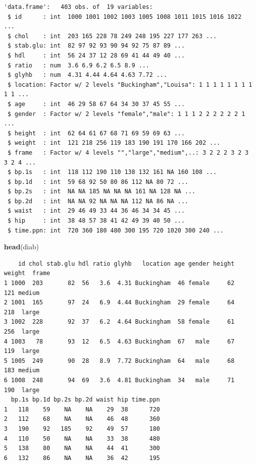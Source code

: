 \documentclass[
  11pt,
]{krantz}
\newenvironment{Shaded}{\begin{snugshade}}{\end{snugshade}}
\newcommand{\KeywordTok}[1]{\textcolor[rgb]{0.27,0.27,0.27}{\textbf{#1}}}
\newcommand{\NormalTok}[1]{#1}
\begin{document}
\begin{verbatim}
'data.frame':   403 obs. of  19 variables:
 $ id      : int  1000 1001 1002 1003 1005 1008 1011 1015 1016 1022 ...
 $ chol    : int  203 165 228 78 249 248 195 227 177 263 ...
 $ stab.glu: int  82 97 92 93 90 94 92 75 87 89 ...
 $ hdl     : int  56 24 37 12 28 69 41 44 49 40 ...
 $ ratio   : num  3.6 6.9 6.2 6.5 8.9 ...
 $ glyhb   : num  4.31 4.44 4.64 4.63 7.72 ...
 $ location: Factor w/ 2 levels "Buckingham","Louisa": 1 1 1 1 1 1 1 1 1 1 ...
 $ age     : int  46 29 58 67 64 34 30 37 45 55 ...
 $ gender  : Factor w/ 2 levels "female","male": 1 1 1 2 2 2 2 2 2 1 ...
 $ height  : int  62 64 61 67 68 71 69 59 69 63 ...
 $ weight  : int  121 218 256 119 183 190 191 170 166 202 ...
 $ frame   : Factor w/ 4 levels "","large","medium",..: 3 2 2 2 3 2 3 3 2 4 ...
 $ bp.1s   : int  118 112 190 110 138 132 161 NA 160 108 ...
 $ bp.1d   : int  59 68 92 50 80 86 112 NA 80 72 ...
 $ bp.2s   : int  NA NA 185 NA NA NA 161 NA 128 NA ...
 $ bp.2d   : int  NA NA 92 NA NA NA 112 NA 86 NA ...
 $ waist   : int  29 46 49 33 44 36 46 34 34 45 ...
 $ hip     : int  38 48 57 38 41 42 49 39 40 50 ...
 $ time.ppn: int  720 360 180 480 300 195 720 1020 300 240 ...
\end{verbatim}

\begin{Shaded}
\begin{Highlighting}[]
\KeywordTok{head}\NormalTok{(diab)}
\end{Highlighting}
\end{Shaded}

\begin{verbatim}
    id chol stab.glu hdl ratio glyhb   location age gender height weight  frame
1 1000  203       82  56   3.6  4.31 Buckingham  46 female     62    121 medium
2 1001  165       97  24   6.9  4.44 Buckingham  29 female     64    218  large
3 1002  228       92  37   6.2  4.64 Buckingham  58 female     61    256  large
4 1003   78       93  12   6.5  4.63 Buckingham  67   male     67    119  large
5 1005  249       90  28   8.9  7.72 Buckingham  64   male     68    183 medium
6 1008  248       94  69   3.6  4.81 Buckingham  34   male     71    190  large
  bp.1s bp.1d bp.2s bp.2d waist hip time.ppn
1   118    59    NA    NA    29  38      720
2   112    68    NA    NA    46  48      360
3   190    92   185    92    49  57      180
4   110    50    NA    NA    33  38      480
5   138    80    NA    NA    44  41      300
6   132    86    NA    NA    36  42      195
\end{verbatim}
\end{document}

